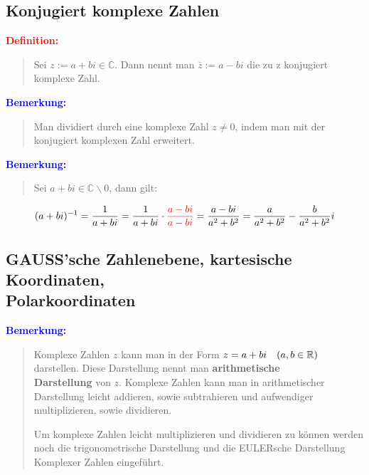 \documentclass{article}
\newcommand{\mesp}{\phantom{\hspace{10px}}}
\newcommand{\red}[1]{\textcolor{red}{#1}}
\newcommand{\blue}[1]{\textcolor{blue}{#1}}
\newcommand{\de}[1]{\red{\textbf{Definition: }}\begin{quote}#1\end{quote}}
\newcommand{\an}[1]{\blue{\textbf{Bemerkung: }}\begin{quote}#1\end{quote}}
\newcommand{\R}{\mathbb{R}}
\newcommand{\C}{\mathbb{C}}
\begin{document}
\subsection{Konjugiert komplexe Zahlen}

\de{Sei $z := a + bi \in \C$. Dann nennt man $\bar{z} := a - bi$ die zu z konjugiert komplexe Zahl.}
\an{Man dividiert durch eine komplexe Zahl $z \neq 0$, indem man mit der konjugiert komplexen Zahl erweitert.}

\an{Sei $a + bi \in \C \backslash {0}$, dann gilt:}
\begin{equation*}
    (a + bi)^{-1} = \frac{1}{a + bi} = \frac{1}{a + bi} \cdot {\color{red}\frac{a - bi}{a - bi}} = \frac{a - bi}{a^2 + b^2} = \frac{a}{a^2 + b^2} - \frac{b}{a^2 + b^2}i
\end{equation*}

\subsection{\texorpdfstring{GAUSS'sche Zahlenebene, kartesische Koordinaten, \\Polarkoordinaten}{GAUSS'sche Zahlenebene, kartesische Koordinaten, Polarkoordinaten}}

\an{Komplexe Zahlen $z$ kann man in der Form $z = a + bi \mesp (a, b \in \R)$
darstellen. Diese Darstellung nennt man {\bf arithmetische\\Darstellung} von $z$. Komplexe Zahlen kann man in arithmetischer Darstellung leicht addieren, sowie subtrahieren und aufwendiger multiplizieren, sowie dividieren.

Um komplexe Zahlen leicht multiplizieren und dividieren zu können werden noch die trigonometrische Darstellung und die EULERsche Darstellung Komplexer Zahlen eingeführt.}
\end{document}
